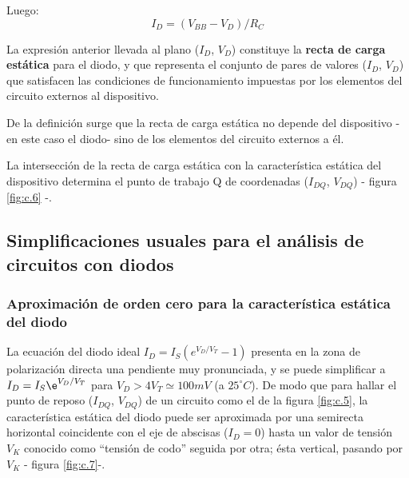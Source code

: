\documentclass{book} %
\theoremstyle{definition}
\begin{document}
\begin{appendices}
Luego:
\[I_D=(V_{BB}-V_D)/R_C\]

La expresión anterior llevada al plano ($I_D$, $V_D$) constituye la \textbf{recta de carga estática} para el diodo, y que representa el conjunto de pares de valores ($I_D$, $V_D$)  que satisfacen las condiciones de funcionamiento impuestas por los elementos del circuito externos al dispositivo.

De la definición surge que la recta de carga estática no depende del dispositivo - en este caso el diodo- sino de los elementos del circuito externos a él.

La intersección de la recta de carga estática con la característica estática del dispositivo determina el punto de trabajo Q de coordenadas  ($I_{DQ}$, $V_{DQ}$) - figura \ref{fig:c.6} -. 


\subsection{Simplificaciones usuales para el análisis de circuitos con diodos}

\subsubsection{Aproximación de orden cero para la característica estática del diodo}
La ecuación del diodo ideal $I_D=I_S\left(e^{V_D/V_T}-1\right)$ presenta en la zona de polarización directa una pendiente muy pronunciada, y se puede simplificar a $I_D=I_S\e^{V_D/V_T}$ para $V_D>4V_T \simeq 100mV$ (a $25^\circ C$). De modo que para hallar el punto de reposo ($I_{DQ}$, $V_{DQ}$) de un circuito como el de la figura \ref{fig:c.5}, la característica estática del diodo puede ser aproximada por una semirecta horizontal coincidente con el eje de abscisas ($I_D=0$) hasta un valor de tensión $V_K$ conocido como ``tensión de codo'' seguida por otra; ésta vertical, pasando por $V_K$ - figura \ref{fig:c.7}-.


\end{appendices}
\end{document}
